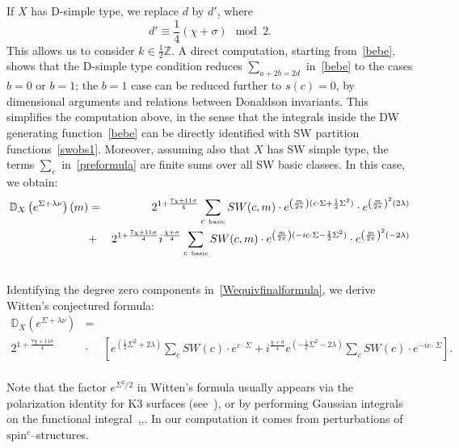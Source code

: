 \documentclass[a4paper,12pt,reqno,sumlimits]{amsart}
\theoremstyle{plain}
\theoremstyle{definition}
\newcommand{\D}{{\mathbb D}}
\newcommand{\Z}{{\mathbb Z}}
\newcommand{\1}{{\bf 1}}
\newcommand{\ex}[1]{{e^{#1}}}
\newcommand{\spinc}{$\text{spin}^c$}
\numberwithin{equation}{section}
\begin{document}
If $X$ has D-simple type, we replace $d$ by $d'$, where
$$
d'\equiv\frac{1}{4}(\chi+\sigma)\mod 2.
$$
This allows us to consider $k\in\frac{1}{2}\Z$. A direct computation,
starting from~\eqref{bebe}, shows that the D-simple type condition reduces
$\displaystyle\sum_{a+2b=2d}$ in~\eqref{bebe} to the cases $b=0$ or $b=1$;
the $b=1$ case can be reduced further to $s(c)=0$, by dimensional arguments
and relations between Donaldson invariants.  This simplifies the computation
above, in the sense that the integrals inside the DW generating
function~\eqref{bebe} can be directly identified with SW partition
functions~\eqref{swobs1}.  Moreover, assuming also that $X$ has SW simple
type, the terms $\displaystyle\sum_c$ in~\eqref{preformula} are finite sums
over all SW basic classes.  In this case, we obtain:
\begin{eqnarray}
  \label{Wequivfinalformula}
  \D_X\left(e^{\Sigma+\lambda\nu}\right)(m) &=& 2^{1+\frac{7\chi+11\sigma}{4}}
  \sum_{c\hbox{ \tiny{basic}}} 
  SW(c,m)\cdot e^{\left(\frac{m}{2\pi}\right)(c\cdot\Sigma+\frac{1}{2}\Sigma^2)}
  \cdot e^{\left(\frac{m}{2\pi}\right)^2 (2\lambda)}\nonumber\\
  &+& 2^{1+\frac{7\chi+11\sigma}{4}} i^{\frac{\chi+\sigma}{4}}
  \sum_{c\hbox{ \tiny{basic}}} 
  SW(c,m)\cdot e^{\left(\frac{m}{2\pi}\right)(-ic\cdot\Sigma-\frac{1}{2}\Sigma^2)}
  \cdot e^{\left(\frac{m}{2\pi}\right)^2 (-2\lambda)}\nonumber\\
  \,
\end{eqnarray}
Identifying the degree zero components in~\eqref{Wequivfinalformula}, we
derive Witten's conjectured formula:
\begin{eqnarray*}
  \label{Wfinalformula}
  \D_X\left(e^{\Sigma+\lambda\nu}\right)&=&\\
  2^{\scriptstyle{1+\frac{7\chi+11\sigma}{4}}}
  &\cdot&\left[e^{\left(\frac{1}{2}\Sigma^2+2\lambda\right)}
    \sum_c SW(c)\cdot e^{\scriptstyle{c\cdot\Sigma}}+i^{\frac{\chi+\sigma}{4}}
    e^{\left(-\frac{1}{2}\Sigma^2-2\lambda\right)}
    \sum_c SW(c)\cdot e^{\scriptstyle{-ic\cdot\Sigma}}\right].\\
\end{eqnarray*}

Note that the factor $\ex{\Sigma^2/2}$ in Witten's formula usually appears
via the polarization identity for K3 surfaces (see~\cite[p.  690]{km}), or by
performing Gaussian integrals on the functional
integral~\cite{park},\cite{ewdon2},\cite{ewmono}. In our computation it comes
from perturbations of \spinc--structures.
\end{document}
